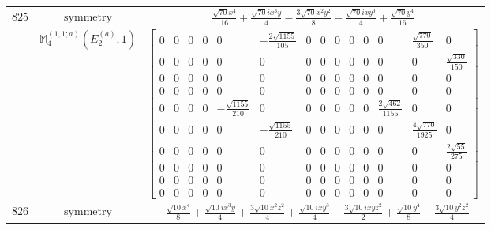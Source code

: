 \documentclass[fleqn,8pt,landscape]{jsarticle}
\begin{document}
\begin{longtable}{ccc}
$ 825 $ & $ \text{symmetry} $ & $ \frac{\sqrt{70} x^{4}}{16} + \frac{\sqrt{70} i x^{3} y}{4} - \frac{3 \sqrt{70} x^{2} y^{2}}{8} - \frac{\sqrt{70} i x y^{3}}{4} + \frac{\sqrt{70} y^{4}}{16} $ \\
$  $ & $ \mathbb{M}_{4}^{(1,1;a)}(E_{2}^{(a)},1) $ & $ \begin{bmatrix} 0 & 0 & 0 & 0 & 0 & - \frac{2 \sqrt{1155}}{105} & 0 & 0 & 0 & 0 & 0 & 0 & \frac{\sqrt{770}}{350} & 0 \\ 0 & 0 & 0 & 0 & 0 & 0 & 0 & 0 & 0 & 0 & 0 & 0 & 0 & \frac{\sqrt{330}}{150} \\ 0 & 0 & 0 & 0 & 0 & 0 & 0 & 0 & 0 & 0 & 0 & 0 & 0 & 0 \\ 0 & 0 & 0 & 0 & 0 & 0 & 0 & 0 & 0 & 0 & 0 & 0 & 0 & 0 \\ 0 & 0 & 0 & 0 & - \frac{\sqrt{1155}}{210} & 0 & 0 & 0 & 0 & 0 & 0 & \frac{2 \sqrt{462}}{1155} & 0 & 0 \\ 0 & 0 & 0 & 0 & 0 & - \frac{\sqrt{1155}}{210} & 0 & 0 & 0 & 0 & 0 & 0 & \frac{4 \sqrt{770}}{1925} & 0 \\ 0 & 0 & 0 & 0 & 0 & 0 & 0 & 0 & 0 & 0 & 0 & 0 & 0 & \frac{2 \sqrt{55}}{275} \\ 0 & 0 & 0 & 0 & 0 & 0 & 0 & 0 & 0 & 0 & 0 & 0 & 0 & 0 \\ 0 & 0 & 0 & 0 & 0 & 0 & 0 & 0 & 0 & 0 & 0 & 0 & 0 & 0 \\ 0 & 0 & 0 & 0 & 0 & 0 & 0 & 0 & 0 & 0 & 0 & 0 & 0 & 0 \end{bmatrix} $ \\ \hline
$ 826 $ & $ \text{symmetry} $ & $ - \frac{\sqrt{10} x^{4}}{8} + \frac{\sqrt{10} i x^{3} y}{4} + \frac{3 \sqrt{10} x^{2} z^{2}}{4} + \frac{\sqrt{10} i x y^{3}}{4} - \frac{3 \sqrt{10} i x y z^{2}}{2} + \frac{\sqrt{10} y^{4}}{8} - \frac{3 \sqrt{10} y^{2} z^{2}}{4} $ \\

\end{longtable}
\end{document}
